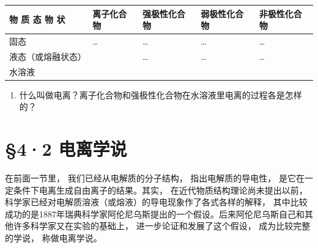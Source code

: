 {\def\LTcaptype{none} %
\begin{longtable}[]{@{}
  >{\raggedright\arraybackslash}p{}
  >{\raggedright\arraybackslash}p{}
  >{\raggedright\arraybackslash}p{}
  >{\raggedright\arraybackslash}p{}
  >{\raggedright\arraybackslash}p{}@{}}
\toprule\noalign{}
\begin{minipage}[b]{\linewidth}\raggedright
物 质 态 物 状
\end{minipage} & \begin{minipage}[b]{\linewidth}\raggedright
离子化合物
\end{minipage} & \begin{minipage}[b]{\linewidth}\raggedright
强极性化合物
\end{minipage} & \begin{minipage}[b]{\linewidth}\raggedright
弱极性化合物
\end{minipage} & \begin{minipage}[b]{\linewidth}\raggedright
非极性化合物
\end{minipage} \\
\midrule\noalign{}
\endhead
\bottomrule\noalign{}
\endlastfoot
固态 & \ldots{} & \ldots{} & \ldots{} & \ldots{} \\
液态（或熔融状态） & & \ldots{} & \ldots{} & \ldots{} \\
水溶液 & & & & \\
\end{longtable}
}

\begin{enumerate}[start=7]
\item
  什么叫做电离？离子化合物和强极性化合物在水溶液里电离的过程各是怎样的？
\end{enumerate}

\section{§4·2 电离学说}

在前面一节里， 我们已经从电解质的分子结构， 指出电解质的导电性，
是它在一定条件下电离生成自由离子的结果。其实，
在近代物质结构理论尚未提出以前，
科学家已经对电解质溶液（或熔液）的导电现象作了各式各样的解释，
其中比较成功的是1887年瑞典科学家阿伦尼乌斯提出的一个假设。后来阿伦尼乌斯自己和其他许多科学家又在实验的基础上，
进一步论证和发展了这个假设， 成为比较完整的学说， 称做电离学说。


